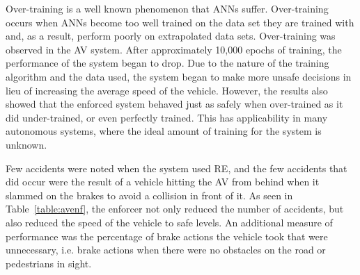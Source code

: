 Over-training is a well known phenomenon that \acp{ANN} suffer. 
Over-training occurs when \acp{ANN} become too well trained on the data set they are trained with and, as a result, perform poorly on extrapolated data sets. 
Over-training was observed in the \ac{AV} system.
After approximately 10,000 epochs of training, the performance of the system began to drop. 
Due to the nature of the training algorithm and the data used, the system began to make more unsafe decisions in lieu of increasing the average speed of the vehicle.
However, the results also showed that the enforced system behaved just as safely when over-trained as it did under-trained, or even perfectly trained. 
This has applicability in many autonomous systems, where the ideal amount of training for the system is unknown. 

Few accidents were noted when the system used \ac{RE}, and the few accidents that did occur were the result of a vehicle hitting the \ac{AV} from behind when it slammed on the brakes to avoid a collision in front of it.
As seen in Table~\ref{table:avenf}, the enforcer not only reduced the number of accidents, but also reduced the speed of the vehicle to safe levels. 
An additional measure of performance was the percentage of brake actions the vehicle took that were unnecessary, i.e. brake actions when there were no obstacles on the road or pedestrians in sight.

